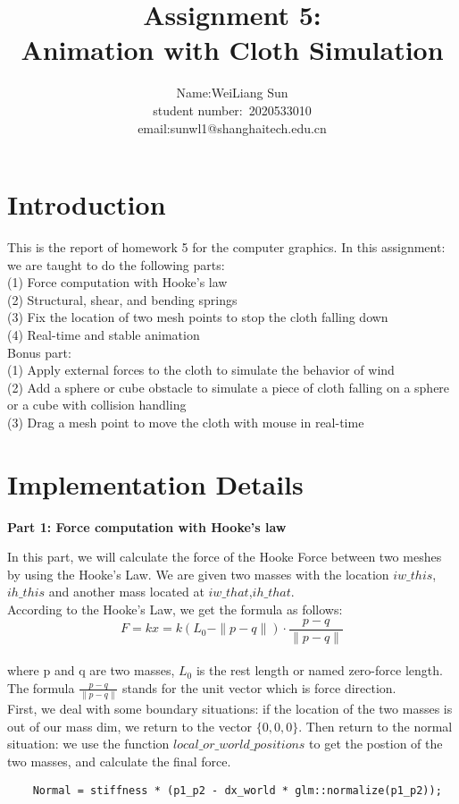 \documentclass[acmtog]{acmart}
\title{Assignment 5:\\ {Animation with Cloth Simulation}}
\author{Name:\quad WeiLiang Sun  \\ student number:\ 2020533010
\\email:\quad sunwl1@shanghaitech.edu.cn}
\begin{document}
\maketitle

\vspace*{2 ex}

\section{Introduction} 

This is the report of homework 5 for the computer graphics. In this assignment: we are taught to do the following parts: \\
(1) Force computation with Hooke's law \\
(2) Structural, shear, and bending springs \\
(3) Fix the location of two mesh points to stop the cloth falling down \\
(4) Real-time and stable animation \\
Bonus part: \\
(1) Apply external forces to the cloth to simulate the behavior of wind \\
(2) Add a sphere or cube obstacle to simulate a piece of cloth falling on a sphere or a cube with collision handling \\
(3) Drag a mesh point to move the cloth with mouse in real-time

\section{Implementation Details}

\textbf{Part 1: Force computation with Hooke's law}

In this part, we will calculate the force of the Hooke Force between two meshes by using the Hooke's Law. We are given two masses with the location $iw\_this$,$ih\_this$ and another mass located at $iw\_that$,$ih\_that$. \\
According to the Hooke's Law, we get the formula as follows: \\
$$F=kx=k(L_0-\|p-q\|)\cdot \frac{p-q}{\|p-q\|}$$ \\
where p and q are two masses, $L_0$ is the rest length or named zero-force length. The formula $\frac{p-q}{\|p-q\|}$ stands for the unit vector which is force direction. \\
First, we deal with some boundary situations: if the location of the two masses is out of our mass dim, we return to the vector $\{0,0,0\}$. Then return to the normal situation: we use the function $local\_or\_world\_positions$ to get the postion of the two masses, and calculate the final force. \\
\begin{lstlisting}
    Normal = stiffness * (p1_p2 - dx_world * glm::normalize(p1_p2));
\end{lstlisting}
\end{document}
